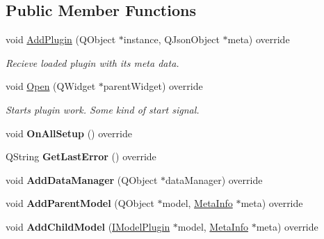 \subsection*{Public Member Functions}
\begin{DoxyCompactItemize}
\item 
void \hyperlink{class_main_menu_model_plugin_aedb87208e81b8ee847fc694805364288}{Add\+Plugin} (Q\+Object $\ast$instance, Q\+Json\+Object $\ast$meta) override
\begin{DoxyCompactList}\small\item\em Recieve loaded plugin with it\textquotesingle{}s meta data. \end{DoxyCompactList}\item 
void \hyperlink{class_main_menu_model_plugin_a2eb04afbe1c9a301a7031816f37018ab}{Open} (Q\+Widget $\ast$parent\+Widget) override
\begin{DoxyCompactList}\small\item\em Starts plugin work. Some kind of \textquotesingle{}start\textquotesingle{} signal. \end{DoxyCompactList}\item 
void {\bfseries On\+All\+Setup} () override\hypertarget{class_main_menu_model_plugin_a560982062f2b3a5227dd5a9e921bad84}{}\label{class_main_menu_model_plugin_a560982062f2b3a5227dd5a9e921bad84}

\item 
Q\+String {\bfseries Get\+Last\+Error} () override\hypertarget{class_main_menu_model_plugin_aec44d8d7a4a40b1d7a008e2612549419}{}\label{class_main_menu_model_plugin_aec44d8d7a4a40b1d7a008e2612549419}

\item 
void {\bfseries Add\+Data\+Manager} (Q\+Object $\ast$data\+Manager) override\hypertarget{class_main_menu_model_plugin_adfd74879db8365c33705e6ff3b8c1606}{}\label{class_main_menu_model_plugin_adfd74879db8365c33705e6ff3b8c1606}

\item 
void {\bfseries Add\+Parent\+Model} (Q\+Object $\ast$model, \hyperlink{struct_meta_info}{Meta\+Info} $\ast$meta) override\hypertarget{class_main_menu_model_plugin_ac441401b496ad4412a94e0e3c17a2d78}{}\label{class_main_menu_model_plugin_ac441401b496ad4412a94e0e3c17a2d78}

\item 
void {\bfseries Add\+Child\+Model} (\hyperlink{class_i_model_plugin}{I\+Model\+Plugin} $\ast$model, \hyperlink{struct_meta_info}{Meta\+Info} $\ast$meta) override\hypertarget{class_main_menu_model_plugin_af4f21091cb24559de4485230ace97bd3}{}\label{class_main_menu_model_plugin_af4f21091cb24559de4485230ace97bd3}


\end{DoxyCompactItemize}
